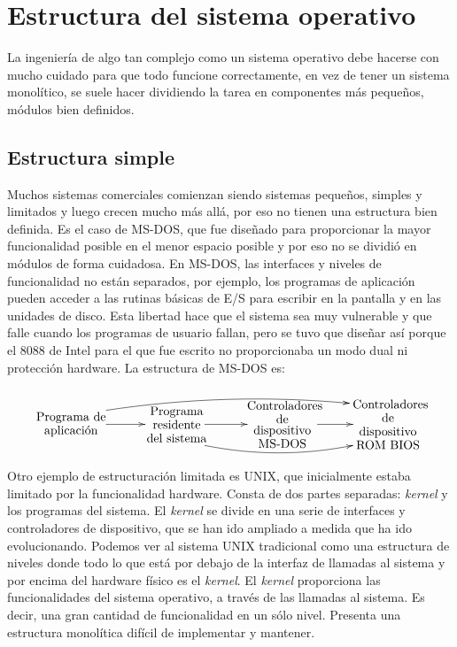 \documentclass[10pt,a4paper,spanish]{report}
\begin{document}

  \section{Estructura del sistema operativo}
  \noindent
  La ingeniería de algo tan complejo como un sistema operativo debe hacerse con mucho cuidado para que todo funcione correctamente, en vez de tener un sistema monolítico, se suele hacer dividiendo la tarea en componentes más pequeños, módulos bien definidos.

  \subsection{Estructura simple}
  \noindent
  Muchos sistemas comerciales comienzan siendo sistemas pequeños, simples y limitados y luego crecen mucho más allá, por eso no tienen una estructura bien definida. Es el caso de MS-DOS, que fue diseñado para proporcionar la mayor funcionalidad posible en el menor espacio posible y por eso no se dividió en módulos de forma cuidadosa. En MS-DOS, las interfaces y niveles de funcionalidad no están separados, por ejemplo, los programas de aplicación pueden acceder a las rutinas básicas de E/S para escribir en la pantalla y en las unidades de disco. Esta libertad hace que el sistema sea muy vulnerable y que falle cuando los programas de usuario fallan, pero se tuvo que diseñar así porque el 8088 de Intel para el que fue escrito no proporcionaba un modo dual ni protección hardware. La estructura de MS-DOS es:

  \[\begin{xy}
  ,(0,0)*+=<20mm>[]\txt<20mm>{Programa de aplicación}
  ,(30,0)*+=<20mm>[]\txt<20mm>{Programa residente\\del sistema}
  ,(60,0)*+=<20mm>[]\txt<20mm>{Controladores de\\dispositivo MS-DOS}
  ,(90,0)*+=<20mm>[]\txt<20mm>{Controladores de dispositivo\\ROM BIOS}
  \ar@{->} (10,0);(21,0)
  \ar@{->} (38,0);(50,0)
  \ar@{->} (70,0);(80,0)
  \ar@/^/ (10,4);(79,6)
  \ar@/_/ (38,-6);(80,-6)
  \end{xy}\]
  \noindent
  Otro ejemplo de estructuración limitada es UNIX, que inicialmente estaba limitado por la funcionalidad hardware. Consta de dos partes separadas: \textit{kernel} y los programas del sistema. El \textit{kernel} se divide en una serie de interfaces y controladores de dispositivo, que se han ido ampliado a medida que ha ido evolucionando. Podemos ver al sistema UNIX tradicional como una estructura de niveles donde todo lo que está por debajo de la interfaz de llamadas al sistema y por encima del hardware físico es el \textit{kernel}. El \textit{kernel} proporciona las funcionalidades del sistema operativo, a través de las llamadas al sistema. Es decir, una gran cantidad de funcionalidad en un sólo nivel. Presenta una estructura monolítica difícil de implementar y mantener.
\end{document}
